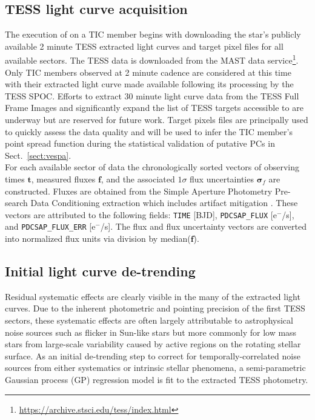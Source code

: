 \subsection{TESS light curve acquisition}
The execution of \pipeline{} on a TIC member begins with downloading the star's publicly available
2 minute TESS extracted light curves and target pixel files for all available sectors. 
The TESS data is downloaded from the MAST data service\footnote{\url{https://archive.stsci.edu/tess/index.html}}.
Only TIC members observed at 2 minute cadence are considered at this time with their extracted light curve made available
following its processing by the TESS SPOC. Efforts to extract 30 minute light
curve data from the TESS Full Frame Images and significantly expand the list of TESS targets accessible to
\pipeline{} are underway but are reserved for future work.
Target pixels files are principally used to quickly assess the data quality and will be used to
infer the TIC member's point spread function during the statistical validation of putative PCs in Sect.~\ref{sect:vespa}. \\

For each available sector of data the chronologically sorted vectors of observing times $\mathbf{t}$,
measured fluxes $\mathbf{f}$, and the associated $1\sigma$ flux
uncertainties $\boldsymbol{\sigma}_{f}$ are constructed. Fluxes are obtained from the Simple Aperture Photometry Pre-search
Data Conditioning extraction which includes artifact mitigation \citep{smith12}. These vectors are
attributed to the following fields: \texttt{TIME} [BJD], \texttt{PDCSAP\_FLUX} [e$^-$/s], and
\texttt{PDCSAP\_FLUX\_ERR} [e$^-$/s]. The flux and flux uncertainty vectors are converted into normalized
flux units via division by median($\mathbf{f}$).

\subsection{Initial light curve de-trending} \label{sect:detrend}
Residual systematic effects are clearly visible in the many of the extracted light curves. Due to the
inherent photometric and pointing precision of the first TESS sectors, these systematic effects
are often largely attributable to astrophysical noise sources such as flicker \citep{bastien13} in
Sun-like stars but more commonly for low mass stars from
large-scale variability caused by active regions on the rotating stellar surface. As an initial de-trending step
to correct for temporally-correlated noise sources from either systematics or intrinsic stellar phenomena,
a semi-parametric Gaussian process (GP) regression model is fit to the extracted TESS photometry. \\

